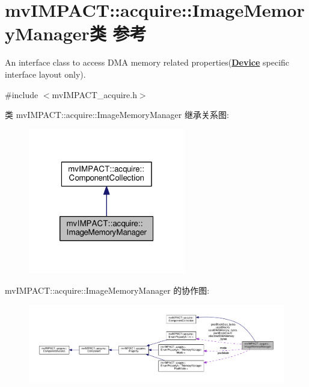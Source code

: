 \hypertarget{classmv_i_m_p_a_c_t_1_1acquire_1_1_image_memory_manager}{\section{mv\+I\+M\+P\+A\+C\+T\+:\+:acquire\+:\+:Image\+Memory\+Manager类 参考}
\label{classmv_i_m_p_a_c_t_1_1acquire_1_1_image_memory_manager}
}


An interface class to access D\+M\+A memory related properties({\bfseries \hyperlink{classmv_i_m_p_a_c_t_1_1acquire_1_1_device}{Device}} specific interface layout only).  




{\ttfamily \#include $<$mv\+I\+M\+P\+A\+C\+T\+\_\+acquire.\+h$>$}



类 mv\+I\+M\+P\+A\+C\+T\+:\+:acquire\+:\+:Image\+Memory\+Manager 继承关系图\+:
\nopagebreak
\begin{figure}[H]
\begin{center}
\leavevmode
\includegraphics[width=194pt]{classmv_i_m_p_a_c_t_1_1acquire_1_1_image_memory_manager__inherit__graph}
\end{center}
\end{figure}


mv\+I\+M\+P\+A\+C\+T\+:\+:acquire\+:\+:Image\+Memory\+Manager 的协作图\+:
\nopagebreak
\begin{figure}[H]
\begin{center}
\leavevmode
\includegraphics[width=350pt]{classmv_i_m_p_a_c_t_1_1acquire_1_1_image_memory_manager__coll__graph}
\end{center}
\end{figure}
